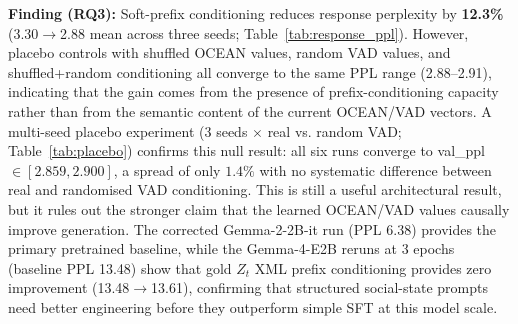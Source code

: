 \documentclass[11pt]{article}
\begin{document}
\begin{table}[t]
\centering
\caption{Response generation comparison. \textbf{Bold}: best PPL. The soft-prefix gain is $12.3\%$, but placebo ablations show this gain is not attributable to the semantic content of the current OCEAN+VAD values. ConditionalDialogue reports mean across 3 seeds (42--44).}
\label{tab:response_ppl}
\small
{}
\end{table}

\textbf{Finding (RQ3):} Soft-prefix conditioning reduces response perplexity by \textbf{12.3\%} (3.30$\to$2.88 mean across three seeds; Table~\ref{tab:response_ppl}).
However, placebo controls with shuffled OCEAN values, random VAD values, and shuffled+random conditioning all converge to the same PPL range (2.88--2.91), indicating that the gain comes from the presence of prefix-conditioning capacity rather than from the semantic content of the current OCEAN/VAD vectors.
A multi-seed placebo experiment (3 seeds $\times$ real vs. random VAD; Table~\ref{tab:placebo}) confirms this null result: all six runs converge to val\_ppl $\in [2.859, 2.900]$, a spread of only $1.4\%$ with no systematic difference between real and randomised VAD conditioning.
This is still a useful architectural result, but it rules out the stronger claim that the learned OCEAN/VAD values causally improve generation.
The corrected Gemma-2-2B-it run (PPL 6.38) provides the primary pretrained baseline, while the Gemma-4-E2B reruns at 3 epochs (baseline PPL 13.48) show that gold $Z_t$ XML prefix conditioning provides zero improvement (13.48$\to$13.61), confirming that structured social-state prompts need better engineering before they outperform simple SFT at this model scale.
\end{document}
